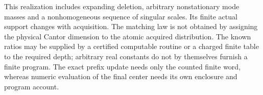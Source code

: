 This realization includes expanding deletion, arbitrary nonstationary mode masses and a nonhomogeneous sequence of singular scales. Its finite actual support changes with acquisition. The matching law is not obtained by assigning the physical Cantor dimension to the atomic acquired distribution. The known ratios may be supplied by a certified computable routine or a charged finite table to the required depth; arbitrary real constants do not by themselves furnish a finite program. The exact prefix update needs only the counted finite word, whereas numeric evaluation of the final center needs its own enclosure and program account.
